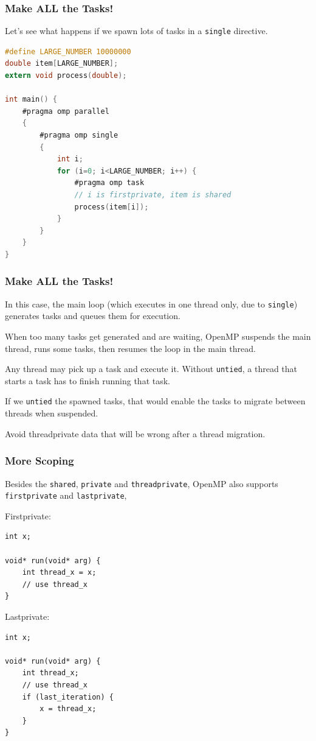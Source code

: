 \begin{frame}[fragile]
\frametitle{Make ALL the Tasks!}

Let's see what happens
if we spawn lots of tasks in a {\tt single} directive.

  \begin{lstlisting}[language=C]
#define LARGE_NUMBER 10000000
double item[LARGE_NUMBER];
extern void process(double);

int main() {
    #pragma omp parallel
    {
        #pragma omp single
        {
            int i;
            for (i=0; i<LARGE_NUMBER; i++) {
                #pragma omp task
                // i is firstprivate, item is shared
                process(item[i]);
            }
        }
    }
}
  \end{lstlisting}

\end{frame}


\begin{frame}[fragile]
\frametitle{Make ALL the Tasks!}

In this case, the main loop (which executes in one thread only, due to {\tt single}) generates tasks and queues them for execution.

When too many tasks get generated and are waiting, OpenMP suspends the main thread, runs some tasks, then resumes the loop in the main thread.

Any thread may pick up a task and execute it. Without {\tt untied}, a thread that starts a task has to finish running that task.

If we {\tt untied} the spawned tasks, that would enable the tasks to
migrate between threads when suspended.

Avoid threadprivate data that
will be wrong after a thread migration.

\end{frame}


\begin{frame}[fragile]
\frametitle{More Scoping}

Besides the {\tt shared}, {\tt private} and {\tt threadprivate}, OpenMP also 
supports {\tt firstprivate} and {\tt lastprivate},

Firstprivate:
  \begin{lstlisting}
int x;

void* run(void* arg) {
    int thread_x = x;
    // use thread_x
}
  \end{lstlisting}


Lastprivate:
  \begin{lstlisting}
int x;

void* run(void* arg) {
    int thread_x;
    // use thread_x
    if (last_iteration) {
        x = thread_x;
    }
}
  \end{lstlisting}

\end{frame}


